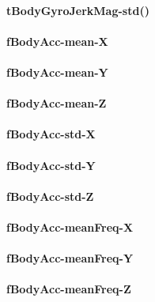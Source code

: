\documentclass[
]{article}
\begin{document}
\hypertarget{tbodygyrojerkmag-std}{%
\paragraph{tBodyGyroJerkMag-std()}\label{tbodygyrojerkmag-std}}

\hypertarget{fbodyacc-mean-x}{%
\paragraph{fBodyAcc-mean-X}\label{fbodyacc-mean-x}}

\hypertarget{fbodyacc-mean-y}{%
\paragraph{fBodyAcc-mean-Y}\label{fbodyacc-mean-y}}

\hypertarget{fbodyacc-mean-z}{%
\paragraph{fBodyAcc-mean-Z}\label{fbodyacc-mean-z}}

\hypertarget{fbodyacc-std-x}{%
\paragraph{fBodyAcc-std-X}\label{fbodyacc-std-x}}

\hypertarget{fbodyacc-std-y}{%
\paragraph{fBodyAcc-std-Y}\label{fbodyacc-std-y}}

\hypertarget{fbodyacc-std-z}{%
\paragraph{fBodyAcc-std-Z}\label{fbodyacc-std-z}}

\hypertarget{fbodyacc-meanfreq-x}{%
\paragraph{fBodyAcc-meanFreq-X}\label{fbodyacc-meanfreq-x}}

\hypertarget{fbodyacc-meanfreq-y}{%
\paragraph{fBodyAcc-meanFreq-Y}\label{fbodyacc-meanfreq-y}}

\hypertarget{fbodyacc-meanfreq-z}{%
\paragraph{fBodyAcc-meanFreq-Z}\label{fbodyacc-meanfreq-z}}
\end{document}

